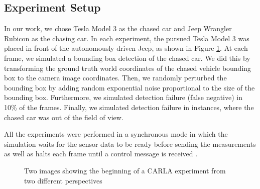 \documentclass{ctuthesis/ctuthesis}
\begin{document}
\subsection{Experiment Setup}
In our work, we chose Tesla Model 3 as the chased car and Jeep Wrangler Rubicon as the chasing car. In each experiment, the pursued Tesla Model 3 was placed in front of the autonomously driven Jeep, as shown in Figure \ref{fig:CARLA}. At each frame, we simulated a bounding box detection of the chased car. We did this by transforming the ground truth world coordinates of the chased vehicle bounding box to the camera image coordinates. Then, we randomly perturbed the bounding box by adding random exponential noise proportional to the size of the bounding box. Furthermore, we simulated detection failure (false negative) in 10\% of the frames. Finally, we simulated detection failure in instances, where the chased car was out of the field of view.\par

All the experiments were performed in a synchronous mode in which the simulation waits for the sensor data to be ready before sending the measurements as well as halts each frame until a control message is received \cite{CARLA}. \par

\begin{figure}[]
    \centering
    \qquad
    \caption{Two images showing the beginning of a CARLA experiment from two different perspectives}%
    \label{fig:CARLA}%
\end{figure}
\end{document}
